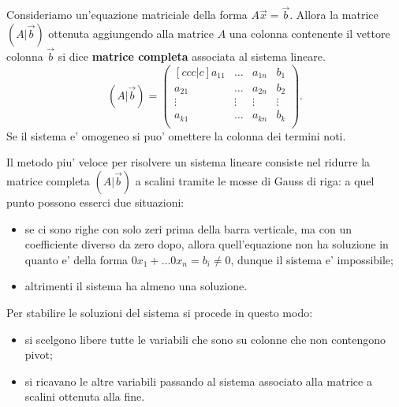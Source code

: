 \begin{definition}
    Consideriamo un'equazione matriciale della forma $A\vec{x} = \vec b$. Allora la matrice $(A|\vec b)$ ottenuta aggiungendo alla matrice $A$ una colonna contenente il vettore colonna $\vec b$ si dice \textbf{matrice completa} associata al sistema lineare.
    \begin{equation}
        (A|\vec b) = \begin{pmatrix}[ccc|c]
            a_{11} & \dots & a_{1n} & b_1\\
            a_{21} & \dots & a_{2n} & b_2\\
            \vdots & \vdots& \vdots & \vdots\\
            a_{k1} & \dots & a_{kn} & b_k\\
        \end{pmatrix}.
    \end{equation}
    Se il sistema e' omogeneo si puo' omettere la colonna dei termini noti.
\end{definition}


Il metodo piu' veloce per risolvere un sistema lineare consiste nel ridurre la matrice completa $(A|\vec b)$ a scalini tramite le mosse di Gauss di riga: a quel punto possono esserci due situazioni:
\begin{itemize}
    \item se ci sono righe con solo zeri prima della barra verticale, ma con un coefficiente diverso da zero dopo, allora quell'equazione non ha soluzione in quanto e' della forma $0x_1 + \dots 0x_n = b_i \neq 0$, dunque il sistema e' impossibile;
    \item altrimenti il sistema ha almeno una soluzione.
\end{itemize}
Per stabilire le soluzioni del sistema si procede in questo modo:
\begin{itemize}
    \item si scelgono libere tutte le variabili che sono su colonne che non contengono pivot;
    \item si ricavano le altre variabili passando al sistema associato alla matrice a scalini ottenuta alla fine.
\end{itemize}

